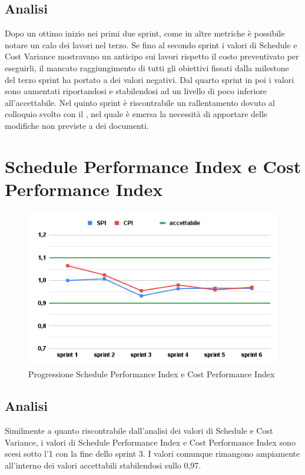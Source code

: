 \subsection{Analisi}
Dopo un ottimo inizio nei primi due sprint, come in altre metriche è possibile notare un calo dei lavori nel terzo. Se fino al secondo sprint i valori di Schedule e Cost Variance mostravano un anticipo sui lavori rispetto il costo preventivato per eseguirli, il mancato raggiungimento di tutti gli obiettivi fissati dalla milestone del terzo sprint ha portato a dei valori negativi. Dal quarto sprint in poi i valori sono aumentati riportandosi e stabilendosi ad un livello di poco inferiore all'accettabile. Nel quinto sprint è riscontrabile un rallentamento dovuto al colloquio svolto con il , nel quale è emersa la necessità di apportare delle modifiche non previste a dei documenti.

\section{Schedule Performance Index e Cost Performance Index}
\begin{figure}[H]
    \centering
    \includegraphics[width=0.8\linewidth]{SPICPI.png}
    \caption{Progressione Schedule Performance Index e Cost Performance Index}
\end{figure}
\subsection{Analisi}
Similmente a quanto riscontrabile dall'analisi dei valori di Schedule e Cost Variance, i valori di Schedule Performance Index e Cost Performance Index sono scesi sotto l'1 con la fine dello sprint 3. I valori comunque rimangono ampiamente all'interno dei valori accettabili stabilendosi sullo 0,97.

